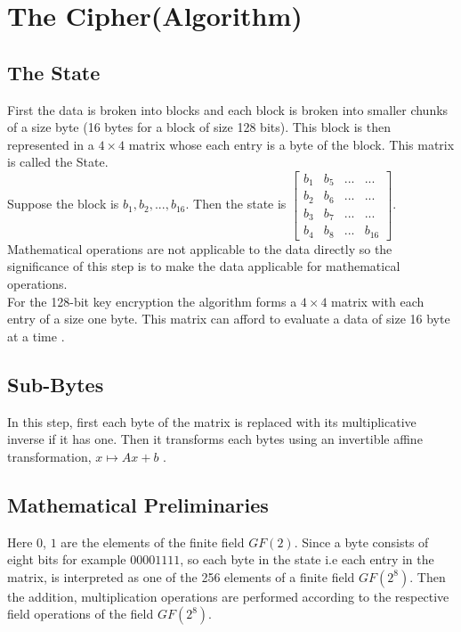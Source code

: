 \vspace{7mm}
\section{The Cipher(Algorithm)}
\subsection{The State}
First the data is broken into blocks and each block is broken into smaller chunks of a size byte (16 bytes for a block of size 128 bits). This block is then represented in a \(4 \times 4\) matrix whose each entry is a byte of the block. This matrix is called the State.\\
  Suppose the block is \(b_1, b_2,...,b_{16}\). Then the state is
    \(\left[\begin{smallmatrix}
  b_1 & b_5 &... & ...\\
  b_2 & b_6 &... & ...\\
  b_3 & b_7 &... & ...\\
  b_4 & b_8 &... & b_{16}
\end{smallmatrix}\right]\).\\[2mm]

Mathematical operations are not applicable to the data directly so the significance of this step is to make the data applicable for mathematical operations.\\
For the 128-bit key encryption the algorithm forms a \(4 \times 4\) matrix with each entry of a size one byte. This matrix can afford to evaluate a data of size 16 byte at a time \cite{aes}.

\vspace{3mm}
\subsection{Sub-Bytes}
In this step, first each byte of the matrix is replaced with its multiplicative inverse if it has one. Then it transforms each bytes using an invertible affine transformation, \(x \mapsto Ax+b\) \cite{aes}.

\subsection{Mathematical Preliminaries}
Here \(0\), \(1\) are the elements of the finite field \(GF(2)\). Since a byte consists of eight bits for example \(00001111\), so each byte in the state i.e each entry in the matrix, is interpreted as one of the 256 elements of a finite field \(GF(2^8)\). Then the addition, multiplication operations are performed according to the respective field operations of the field \(GF(2^8)\).

